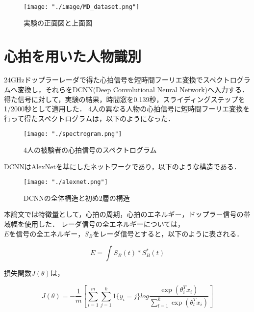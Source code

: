 \documentclass[a4j, dvipdfmx]{jsarticle}
\begin{document}
\begin{figure}[H]\centering
\texttt{[image: "./image/MD\_dataset.png"]}
\caption{実験の正面図と上面図}
\label{fig:}\vspace{0zh}\end{figure}


\section{心拍を用いた人物識別\cite{heartID}}

24GHzドップラーレーダで得た心拍信号を短時間フーリエ変換でスペクトログラムへ変換し，それらをDCNN(Deep Convolutional Neural Network)へ入力する．
得た信号に対して，実験の結果，時間窓を0.139秒，スライディングステップを1/2000秒として適用した．
4人の異なる人物の心拍信号に短時間フーリエ変換を行って得たスペクトログラムは，以下のようになった．

\begin{figure}[H]\centering
\texttt{[image: "./spectrogram.png"]}
\caption{4人の被験者の心拍信号のスペクトログラム}
\vspace{0zh}
\end{figure}

DCNNはAlexNetを基にしたネットワークであり，以下のような構造である．

\begin{figure}[H]\centering
\texttt{[image: "./alexnet.png"]}
\caption{DCNNの全体構造と初め2層の構造}
\vspace{0zh}
\end{figure}

本論文では特徴量として，心拍の周期，心拍のエネルギー，ドップラー信号の帯域幅を使用した．
レーダ信号の全エネルギーについては，$Eを信号の全エネルギー，S_{B}$をレーダ信号とすると，以下のように表される．

\begin{equation}\label{}
E = \int S_{B}(t) * S_{B}^{*}(t)
\end{equation}

損失関数$J(\theta)$は，

\begin{equation}\label{}
J(\theta) = -\frac{1}{m} [\sum_{i=1}^{m} \sum_{j=1}^{k}1\{y_{i}=j\} log\frac{\exp{(\theta_{i}^T x_{i})}}{\sum_{l=1}^{k} \exp{(\theta_{l}^{T} x_i)}}]
\end{equation}
\end{document}
